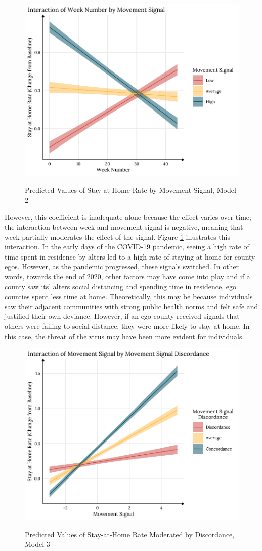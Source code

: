 \begin{figure}
{\centering \includegraphics[width=0.8\linewidth]{figs/paper3/plot-google-h2-1}}
\caption{Predicted Values of Stay-at-Home Rate by Movement Signal, Model 2}\label{fig:plot-google-h2}
\end{figure}

However, this coefficient is inadequate alone because the effect varies over
time; the interaction between week and movement signal is negative, meaning that
week partially moderates the effect of the signal. Figure
\ref{fig:plot-google-h2} illustrates this interaction. In the early days of the
COVID-19 pandemic, seeing a high rate of time spent in residence by alters led
to a high rate of staying-at-home for county egos. However, as the pandemic
progressed, these signals switched. In other words, towards the end of 2020,
other factors may have come into play and if a county saw its' alters social
distancing and spending time in residence, ego counties spent less time at home.
Theoretically, this may be because individuals saw their adjacent communities
with strong public health norms and felt safe and justified their own deviance.
However, if an ego county received signals that others were failing to social
distance, they were more likely to stay-at-home. In this case, the threat of the
virus may have been more evident for individuals.

\begin{figure}
{\centering \includegraphics[width=0.8\linewidth]{figs/paper3/plot-google-h3-1}}
\caption{Predicted Values of Stay-at-Home Rate Moderated by Discordance, Model 3}\label{fig:plot-google-h3}
\end{figure}

